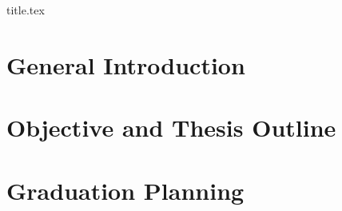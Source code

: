 \documentclass[10pt,a4paper]{article}
\begin{document}
%


{title.tex}









\section{General Introduction}

\cleardoublepage

\section{Objective and Thesis Outline}

\cleardoublepage


\section{Graduation Planning}

\cleardoublepage



\newpage


\cleardoublepage
\end{document}

